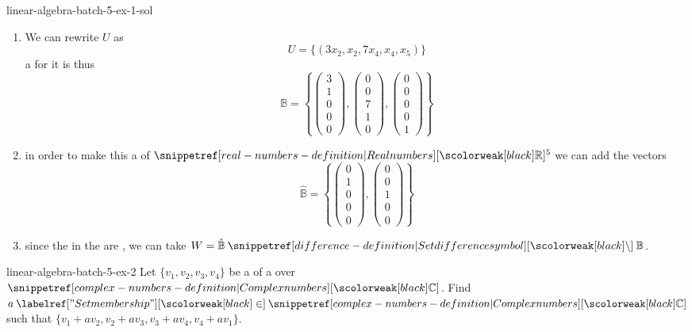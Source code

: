 \documentclass[preview]{standalone}
\begin{document}
\begin{snippetsolution}{linear-algebra-batch-5-ex-1-sol}{}
    \begin{enumerate}
        \item We can rewrite \(U\) as \[U=\{(3x_2, x_2, 7x_4, x_4, x_5)\}\]
        a \basis for it is thus \[\mathbb{B}=\left\{
            \begin{pmatrix}3 \\ 1 \\ 0 \\ 0 \\ 0\end{pmatrix},
            \begin{pmatrix}0 \\ 0 \\ 7 \\ 1 \\ 0\end{pmatrix},
            \begin{pmatrix}0 \\ 0 \\ 0 \\ 0 \\ 1\end{pmatrix}
        \right\}\]
        \item in order to make this a \basis of \(\realnumbers^5\) we can add the vectors
        \[
            \hat{\mathbb{B}} = \left\{
                \begin{pmatrix}0 \\ 1 \\ 0 \\ 0 \\ 0\end{pmatrix},
                \begin{pmatrix}0 \\ 0 \\ 1 \\ 0 \\ 0\end{pmatrix}
            \right\}
        \]
        \item since the \vector[vectors] in the \basis are \linearlyindependent, we can take \(W = \hat{\mathbb{B}} \difference \mathbb{B}\).
    \end{enumerate}
\end{snippetsolution}

\begin{snippetexercise}{linear-algebra-batch-5-ex-2}{}
    Let \(\{v_1, v_2, v_3, v_4\}\) be a \basis of a \vectorspace over \(\complexnumbers\).
    Find \(a\in \complexnumbers\) such that \(\{v_1 + av_2, v_2 + av_3, v_3 + av_4, v_4 + av_1\}\).
\end{snippetexercise}
\end{document}
